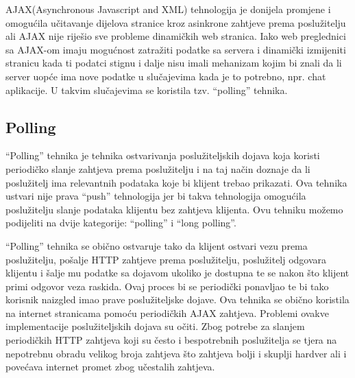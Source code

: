 \documentclass[times, utf8, zavrsni]{fer}
\begin{document}
AJAX(Asynchronous Javascript and XML) tehnologija je donijela promjene i omogućila učitavanje dijelova stranice kroz asinkrone zahtjeve prema poslužitelju ali AJAX nije riješio sve probleme dinamičkih web stranica. Iako web preglednici sa AJAX-om imaju mogućnost zatražiti podatke sa servera i dinamički izmijeniti stranicu kada ti podatci stignu i dalje nisu imali mehanizam kojim bi znali da li server uopće ima nove podatke u slučajevima kada je to potrebno, npr. chat aplikacije. U takvim slučajevima se koristila tzv. ``polling'' tehnika.

\subsection{Polling}
``Polling'' tehnika je tehnika ostvarivanja poslužiteljskih dojava koja koristi periodičko slanje zahtjeva prema poslužitelju i na taj način doznaje da li poslužitelj ima relevantnih podataka koje bi klijent trebao prikazati. Ova tehnika ustvari nije prava ``push'' tehnologija jer bi takva tehnologija omogućila poslužitelju slanje podataka klijentu bez zahtjeva klijenta. Ovu tehniku možemo podijeliti na dvije kategorije: ``polling'' i ``long polling''.

``Polling'' tehnika se obično ostvaruje tako da klijent ostvari vezu prema poslužitelju, pošalje HTTP zahtjeve prema poslužitelju, poslužitelj odgovara klijentu i šalje mu podatke sa dojavom ukoliko je dostupna te se nakon što klijent primi odgovor veza raskida. Ovaj proces bi se periodički ponavljao te bi tako korisnik naizgled imao prave poslužiteljske dojave. Ova tehnika se obično koristila na internet stranicama pomoću periodičkih AJAX zahtjeva. Problemi ovakve implementacije poslužiteljskih dojava su očiti. Zbog potrebe za slanjem periodičkih HTTP zahtjeva koji su često i bespotrebnih poslužitelja se tjera na nepotrebnu obradu velikog broja zahtjeva što zahtjeva bolji i skuplji hardver ali i povećava internet promet zbog učestalih zahtjeva. 
\end{document}
